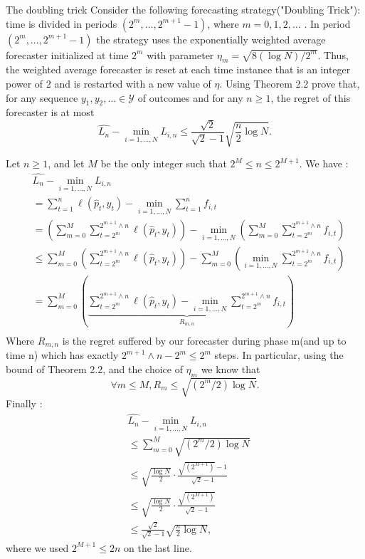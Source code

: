 \begin{exercise}[]{The doubling trick}
	Consider the following forecasting strategy("Doubling Trick"): time is divided in periods $ (2^m,\ldots, 2^{m+1}-1) $, where $ m=0,1,2,\ldots $ . In period $ (2^m,\ldots,2^{m+1}-1) $ the strategy uses the exponentially weighted average forecaster initialized at time $ 2^{m} $ with parameter $ \eta_m = \sqrt{8(\log N)/2^m} $. Thus, the weighted average forecaster is reset at each time instance that is an integer power of 2 and is restarted with a new value of $ \eta $. Using Theorem 2.2 prove that, for any sequence $ y_1,y_2,\ldots \in \mathcal{Y}  $ of outcomes and for any $ n\geq 1 $, the regret of this forecaster is at most
\begin{equation*}
	\widehat{L_n} - \min_{i=1,\ldots,N} L_{i,n} \leq \frac{\sqrt{2}}{\sqrt{2}-1} \sqrt{\frac{n}{2}\log N}.
\end{equation*}

\end{exercise}

\begin{solution}[]
	Let $ n\geq 1 $, and let $ M $ be the only integer such that $ 2^{M}\leq n \leq  2^{M+1}$. We have :
\begin{align*}
	&\widehat{L_n} - \min_{i=1,\ldots,N} L_{i,n} \\
	&= \sum_{t=1}^{n} \ell(\hat{p}_t,y_t) - \min_{i=1,\ldots,N}\sum_{t=1}^{n}f_{i,t} \\
	&= \left( \sum_{m=0}^{M}\sum_{t=2^{m}}^{2^{m+1}\wedge n} \ell(\hat{p}_t,y_t) \right) -  \min_{i=1,\ldots,N}\left(\sum_{m=0}^{M}\sum_{t=2^m}^{2^{m+1}\wedge n}f_{i,t} \right)\\
	&\leq   \sum_{m=0}^{M}\left(\sum_{t=2^{m}}^{2^{m+1}\wedge n} \ell(\hat{p}_t,y_t) \right) -  \sum_{m=0}^{M}\left(\min_{i=1,\ldots,N}\sum_{t=2^m}^{2^{m+1}\wedge n}f_{i,t} \right)\\
	&=   \sum_{m=0}^{M}\left(\underbrace{\sum_{t=2^{m}}^{2^{m+1}\wedge n} \ell(\hat{p}_t,y_t)  -  \min_{i=1,\ldots,N}\sum_{t=2^m}^{2^{m+1}\wedge n}f_{i,t} }_{R_{m,n}}\right)\\
\end{align*}
Where $ R_{m,n} $ is the regret suffered by our forecaster during phase m(and up to time n) which has exactly $ 2^{m+1}\wedge n - 2^{m} \leq 2^{m} $ steps. In particular, using the bound of Theorem 2.2, and the choice of $ \eta_m $ we know that 
\begin{equation*}
	\forall m\leq M, R_m \leq \sqrt{(2^{m}/2)\log N}.
\end{equation*}
Finally :
\begin{align*}
	&\widehat{L_n} - \min_{i=1,\ldots,N} L_{i,n} \\
	&\leq \sum_{m=0}^{M} \sqrt{(2^{m}/2)\log N} \\
	&\leq \sqrt{\frac{\log N}{2}}\cdot \frac{\sqrt{(2^{M+1})}-1}{\sqrt{2}-1}\\
	&\leq \sqrt{\frac{\log N}{2}}\cdot \frac{\sqrt{(2^{M+1})}}{\sqrt{2}-1}\\
	&\leq \frac{\sqrt{2}}{\sqrt{2}-1}\sqrt{\frac{n}{2}\log N},
\end{align*}
where we used $ 2^{M+1} \leq 2n $ on the last line.

\end{solution}
